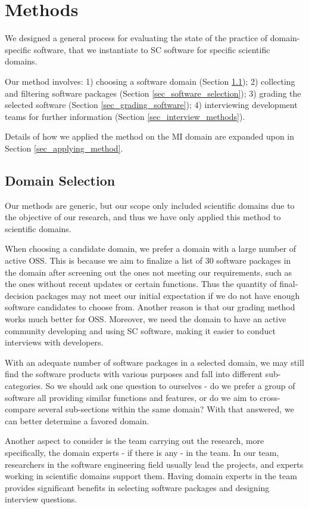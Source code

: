 \chapter{Methods}
\label{ch_methods}

We designed a general process for evaluating the state of the practice of domain-specific software, that we instantiate to SC software for specific scientific domains.

Our method involves: 1) choosing a software domain (Section \ref{sec_domain_selection}); 2) collecting and filtering software packages (Section \ref{sec_software_selection}); 3) grading the selected software (Section \ref{sec_grading_software}); 4) interviewing development teams for further information (Section \ref{sec_interview_methods}).

Details of how we applied the method on the MI domain are expanded upon in Section \ref{sec_applying_method}.

\section{Domain Selection}
\label{sec_domain_selection}
Our methods are generic, but our scope only included scientific domains due to the objective of our research, and thus we have only applied this method to scientific domains.

When choosing a candidate domain, we prefer a domain with a large number of active OSS. This is because we aim to finalize a list of 30 software packages \cite{SmithEtAl2021} in the domain after screening out the ones not meeting our requirements, such as the ones without recent updates or certain functions. Thus the quantity of final-decision packages may not meet our initial expectation if we do not have enough software candidates to choose from. Another reason is that our grading method works much better for OSS. Moreover, we need the domain to have an active community developing and using SC software, making it easier to conduct interviews with developers.

With an adequate number of software packages in a selected domain, we may still find the software products with various purposes and fall into different sub-categories. So we should ask one question to ourselves - do we prefer a group of software all providing similar functions and features, or do we aim to cross-compare several sub-sections within the same domain? With that answered, we can better determine a favored domain.

Another aspect to consider is the team carrying out the research, more specifically, the domain experts - if there is any - in the team. In our team, researchers in the software engineering field usually lead the projects, and experts working in scientific domains support them. Having domain experts in the team provides significant benefits in selecting software packages and designing interview questions.


